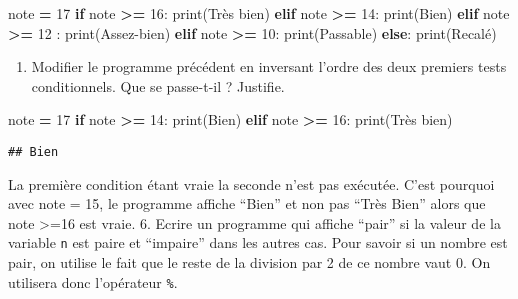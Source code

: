 \documentclass[
]{book}
\newenvironment{Shaded}{\begin{snugshade}}{\end{snugshade}}
\newcommand{\BuiltInTok}[1]{#1}
\newcommand{\ControlFlowTok}[1]{\textcolor[rgb]{0.13,0.29,0.53}{\textbf{#1}}}
\newcommand{\DecValTok}[1]{\textcolor[rgb]{0.00,0.00,0.81}{#1}}
\newcommand{\NormalTok}[1]{#1}
\newcommand{\OperatorTok}[1]{\textcolor[rgb]{0.81,0.36,0.00}{\textbf{#1}}}
\newcommand{\StringTok}[1]{\textcolor[rgb]{0.31,0.60,0.02}{#1}}
\providecommand{\tightlist}{%
  \setlength{\itemsep}{0pt}\setlength{\parskip}{0pt}}
\def\tightlist{}
\begin{document}
\begin{Shaded}
\begin{Highlighting}[]
\NormalTok{note }\OperatorTok{=} \DecValTok{17}
\ControlFlowTok{if}\NormalTok{ note }\OperatorTok{\textgreater{}=} \DecValTok{16}\NormalTok{:}
  \BuiltInTok{print}\NormalTok{(}\StringTok{\textquotesingle{}Très bien\textquotesingle{}}\NormalTok{)}
\ControlFlowTok{elif}\NormalTok{ note }\OperatorTok{\textgreater{}=} \DecValTok{14}\NormalTok{: }
  \BuiltInTok{print}\NormalTok{(}\StringTok{\textquotesingle{}Bien\textquotesingle{}}\NormalTok{)}
\ControlFlowTok{elif}\NormalTok{ note }\OperatorTok{\textgreater{}=} \DecValTok{12}\NormalTok{ : }
  \BuiltInTok{print}\NormalTok{(}\StringTok{\textquotesingle{}Assez{-}bien\textquotesingle{}}\NormalTok{)}
\ControlFlowTok{elif}\NormalTok{ note }\OperatorTok{\textgreater{}=} \DecValTok{10}\NormalTok{:}
  \BuiltInTok{print}\NormalTok{(}\StringTok{\textquotesingle{}Passable\textquotesingle{}}\NormalTok{)}
\ControlFlowTok{else}\NormalTok{:}
  \BuiltInTok{print}\NormalTok{(}\StringTok{\textquotesingle{}Recalé\textquotesingle{}}\NormalTok{)}
\end{Highlighting}
\end{Shaded}

\begin{enumerate}
\def\labelenumi{\arabic{enumi}.}
\setcounter{enumi}{4}
\tightlist
\item
  Modifier le programme précédent en inversant l'ordre des deux premiers tests conditionnels. Que se passe-t-il ? Justifie.
\end{enumerate}

\begin{Shaded}
\begin{Highlighting}[]
\NormalTok{note }\OperatorTok{=} \DecValTok{17}
\ControlFlowTok{if}\NormalTok{ note }\OperatorTok{\textgreater{}=} \DecValTok{14}\NormalTok{: }
  \BuiltInTok{print}\NormalTok{(}\StringTok{\textquotesingle{}Bien\textquotesingle{}}\NormalTok{)}
\ControlFlowTok{elif}\NormalTok{ note }\OperatorTok{\textgreater{}=} \DecValTok{16}\NormalTok{:}
  \BuiltInTok{print}\NormalTok{(}\StringTok{\textquotesingle{}Très bien\textquotesingle{}}\NormalTok{)}
\end{Highlighting}
\end{Shaded}

\begin{verbatim}
## Bien
\end{verbatim}

La première condition étant vraie la seconde n'est pas exécutée. C'est pourquoi avec note = 15, le programme affiche ``Bien'' et non pas ``Très Bien'' alors que note \textgreater=16 est vraie.
6. Ecrire un programme qui affiche ``pair'' si la valeur de la variable \texttt{n} est paire et ``impaire'' dans les autres cas. Pour savoir si un nombre est pair, on utilise le fait que le reste de la division par 2 de ce nombre vaut 0. On utilisera donc l'opérateur \texttt{\%}.
\end{document}
